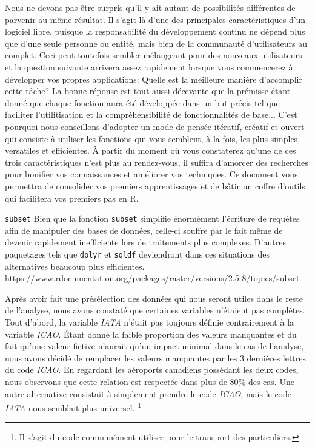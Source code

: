 \vspace{\baselineskip}
Nous ne devons pas être surpris qu'il y ait autant de possibilités différentes de parvenir au même résultat. Il s'agit là d'une des principales caractéristiques d'un logiciel libre, puisque la responsabilité du développement continu ne dépend plus que d'une seule personne ou entité, mais bien de la communauté d'utilisateurs au complet. Ceci peut toutefois sembler mélangeant pour des nouveaux utilisateurs et la question suivante arrivera assez rapidement lorsque vous commencerez à développer vos propres applications: Quelle est la meilleure manière d'accomplir cette tâche? La bonne réponse est tout aussi décevante que la prémisse étant donné que chaque fonction aura été développée dans un but précis tel que faciliter l'utilitisation et la compréhensibilité de fonctionnalités de base... C'est pourquoi nous conseillons d'adopter un mode de pensée itératif, créatif et ouvert qui consiste à utiliser les fonctions qui vous semblent, à la fois, les plus simples, versatiles et efficientes. À partir du moment où vous constaterez qu'une de ces trois caractéristiques n'est plus au rendez-vous, il suffira d'amorcer des recherches pour bonifier vos connaissances et améliorer vos techniques. Ce document vous permettra de consolider vos premiers apprentissages et de bâtir un coffre d'outils qui facilitera vos premiers pas en R. \\

\begin{moreInfo}{\texttt{subset}}
	Bien que la fonction \texttt{subset} simplifie énormément l'écriture de requêtes afin de manipuler des bases de données, celle-ci souffre par le fait même de devenir rapidement inefficiente lors de traitements plus complexes. D'autres paquetages tels que \texttt{dplyr} et \texttt{sqldf} deviendront dans ces situations des alternatives beaucoup plus efficientes. \\
	\url{https://www.rdocumentation.org/packages/raster/versions/2.5-8/topics/subset}
\end{moreInfo}

Après avoir fait une présélection des données qui nous seront utiles dans le reste de l'analyse, nous avons constaté que certaines variables n'étaient pas complètes. Tout d'abord, la variable \emph{IATA} n'était pas toujours définie contrairement à la variable \emph{ICAO}. Étant donné la faible proportion des valeurs manquantes et du fait qu'une valeur fictive n'aurait qu'un impact minimal dans le cas de l'analyse, nous avons décidé de remplacer les valeurs manquantes par les 3 dernières lettres du code \emph{ICAO}. En regardant les aéroports canadiens possédant les deux codes, nous observons que cette relation est respectée dans plus de 80\% des cas. Une autre alternative consistait à simplement prendre le code \emph{ICAO}, mais le code \emph{IATA} nous semblait plus universel. \footnote{Il s'agit du code communément utiliser pour le transport des particuliers.} \\

